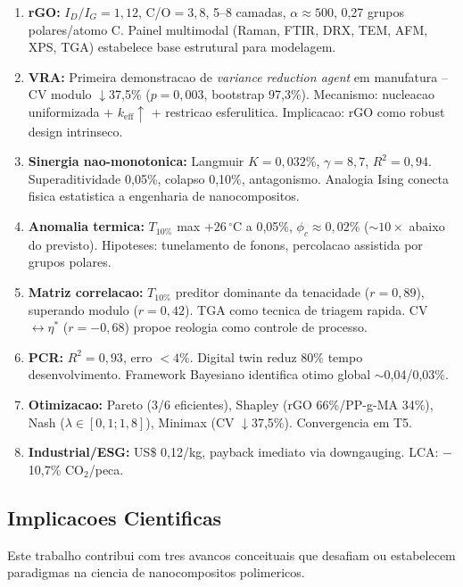 \documentclass[11pt,a4paper,oneside]{article}
\begin{document}
\begin{enumerate}[nosep,leftmargin=*]
    \item {\bfseries rGO:} $I_D/I_G{=}1{,}12$, C/O${=}3{,}8$, 5--8 camadas, $\alpha{\approx}500$, 0,27 grupos polares/atomo C. Painel multimodal (Raman, FTIR, DRX, TEM, AFM, XPS, TGA) estabelece base estrutural para modelagem.
    \item {\bfseries VRA:} Primeira demonstracao de \textit{variance reduction agent} em manufatura -- CV modulo $\downarrow$37,5\% ($p{=}0{,}003$, bootstrap 97,3\%). Mecanismo: nucleacao uniformizada + $k_{\text{eff}}{\uparrow}$ + restricao esferulitica. Implicacao: rGO como robust design intrinseco.
    \item {\bfseries Sinergia nao-monotonica:} Langmuir $K{=}0{,}032\%$, $\gamma{=}8{,}7$, $R^2{=}0{,}94$. Superaditividade 0,05\%, colapso 0,10\%, antagonismo. Analogia Ising conecta fisica estatistica a engenharia de nanocompositos.
    \item {\bfseries Anomalia termica:} $T_{10\%}$ max $+26\,^{\circ}$C a 0,05\%, $\phi_c{\approx}0{,}02\%$ (${\sim}10{\times}$ abaixo do previsto). Hipoteses: tunelamento de fonons, percolacao assistida por grupos polares.
    \item {\bfseries Matriz correlacao:} $T_{10\%}$ preditor dominante da tenacidade ($r{=}0{,}89$), superando modulo ($r{=}0{,}42$). TGA como tecnica de triagem rapida. CV${\leftrightarrow}\eta^*$ ($r{=}{-}0{,}68$) propoe reologia como controle de processo.
    \item {\bfseries PCR:} $R^2{=}0{,}93$, erro ${<}4\%$. Digital twin reduz 80\% tempo desenvolvimento. Framework Bayesiano identifica otimo global ${\sim}$0,04/0,03\%.
    \item {\bfseries Otimizacao:} Pareto (3/6 eficientes), Shapley (rGO 66\%/PP-g-MA 34\%), Nash ($\lambda{\in}[0{,}1;1{,}8]$), Minimax (CV $\downarrow$37,5\%). Convergencia em T5.
    \item {\bfseries Industrial/ESG:} US\$ 0,12/kg, payback imediato via downgauging. LCA: $-$10,7\% CO$_2$/peca.
\end{enumerate}

\subsection{Implicacoes Cientificas}\label{sec:implic_cient}

Este trabalho contribui com tres avancos conceituais que desafiam ou estabelecem paradigmas na ciencia de nanocompositos polimericos.
\end{document}
